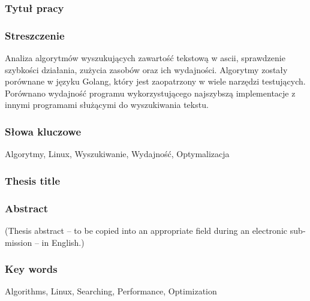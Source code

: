 \subsubsection*{Tytuł pracy} 
\Title

\subsubsection*{Streszczenie}  
Analiza algorytmów wyszukujących zawartość tekstową w ascii, sprawdzenie 
szybkości działania, zużycia zasobów oraz ich wydajności. Algorytmy zostały 
porównane w języku Golang, który jest zaopatrzony w wiele narzędzi testujących.
Porównano wydajność programu wykorzystującego najszybszą implementacje z innymi
programami służącymi do wyszukiwania tekstu.

\subsubsection*{Słowa kluczowe} 
Algorytmy, Linux, Wyszukiwanie, Wydajność, Optymalizacja

\subsubsection*{Thesis title} 
\begin{otherlanguage}{british}
\TitleAlt
\end{otherlanguage}

\subsubsection*{Abstract} 
\begin{otherlanguage}{british}
(Thesis abstract – to be copied into an appropriate field during an electronic submission – in English.)
\end{otherlanguage}
\subsubsection*{Key words}  
\begin{otherlanguage}{british}
Algorithms, Linux, Searching, Performance, Optimization
\end{otherlanguage}

